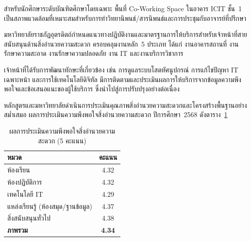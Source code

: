สำหรับนักศึกษาระดับบัณฑิตศึกษาโดยเฉพาะ พื้นที่ Co-Working Space ในอาคาร ICIT ชั้น~1 เป็นสภาพแวดล้อมที่เหมาะสมสำหรับการทำวิทยานิพนธ์/สารนิพนธ์และการประชุมกับอาจารย์ที่ปรึกษา


มหาวิทยาลัยราชภัฏอุตรดิตถ์กำหนดแนวทางปฏิบัติงานและมาตรฐานการให้บริการสำหรับเจ้าหน้าที่สายสนับสนุนด้านสิ่งอำนวยความสะดวก ครอบคลุมงานหลัก~5 ประเภท ได้แก่ งานอาคารสถานที่ งานรักษาความสะอาด งานรักษาความปลอดภัย งาน IT และงานบริการวิชาการ

เจ้าหน้าที่ได้รับการพัฒนาทักษะที่เกี่ยวข้อง เช่น การดูแลระบบโสตทัศนูปกรณ์ การแก้ไขปัญหา IT เฉพาะหน้า และการใช้เทคโนโลยีดิจิทัล มีการติดตามและประเมินผลการให้บริการจากข้อมูลความพึงพอใจและข้อเสนอแนะของผู้ใช้บริการ ซึ่งนำไปสู่การปรับปรุงอย่างต่อเนื่อง



หลักสูตรและมหาวิทยาลัยดำเนินการประเมินคุณภาพสิ่งอำนวยความสะดวกและโครงสร้างพื้นฐานอย่างสม่ำเสมอ ผลการประเมินความพึงพอใจสิ่งอำนวยความสะดวก ปีการศึกษา~2568 ดังตาราง~\ref{tbl:facility_satisfaction}

\begin{table}[H]
  \centering
  \caption{ผลการประเมินความพึงพอใจสิ่งอำนวยความสะดวก (5 คะแนน)}
  \label{tbl:facility_satisfaction}
  \begingroup
  \footnotesize
  \renewcommand{\arraystretch}{1.2}
  \begin{tabular}{|l|c|}
    \hline
    \textbf{หมวด} & \textbf{คะแนน} \\
    \hline
    ห้องเรียน & 4.32 \\
    \hline
    ห้องปฏิบัติการ & 4.32 \\
    \hline
    เทคโนโลยี IT & 4.29 \\
    \hline
    แหล่งเรียนรู้ (ห้องสมุด/ฐานข้อมูล) & 4.37 \\
    \hline
    สิ่งสนับสนุนทั่วไป & 4.38 \\
    \hline
    \textbf{ภาพรวม} & \textbf{4.34} \\
    \hline
  \end{tabular}
  \endgroup
\end{table}

